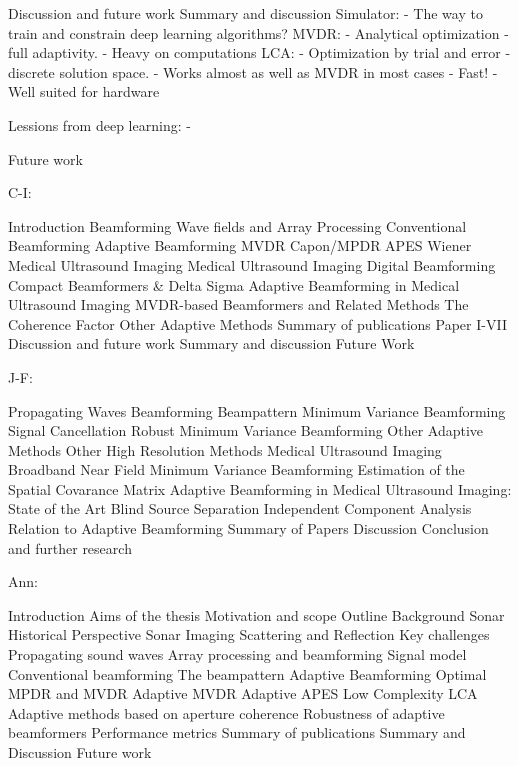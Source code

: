 Discussion and future work
   Summary and discussion
      Simulator:
      - The way to train and constrain deep learning algorithms?
      MVDR:
      - Analytical optimization - full adaptivity.
      - Heavy on computations
      LCA:
      - Optimization by trial and error - discrete solution space.
      - Works almost as well as MVDR in most cases
      - Fast!
      - Well suited for hardware
      
      Lessions from deep learning:
      - 
      
   Future work
   


C-I:

Introduction
   Beamforming
   Wave fields and Array Processing
   Conventional Beamforming
   Adaptive Beamforming
      MVDR
      Capon/MPDR
      APES
      Wiener
   Medical Ultrasound Imaging
   Medical Ultrasound Imaging
   Digital Beamforming
      Compact Beamformers \& Delta Sigma
      Adaptive Beamforming in Medical Ultrasound Imaging
         MVDR-based Beamformers and Related Methods
         The Coherence Factor
         Other Adaptive Methods
Summary of publications
   Paper I-VII
Discussion and future work
   Summary and discussion
   Future Work

   
J-F:

Propagating Waves
Beamforming
  Beampattern
Minimum Variance Beamforming
  Signal Cancellation
  Robust Minimum Variance Beamforming
  Other Adaptive Methods
  Other High Resolution Methods
Medical Ultrasound Imaging
  Broadband Near Field Minimum Variance Beamforming
  Estimation of the Spatial Covarance Matrix
Adaptive Beamforming in Medical Ultrasound Imaging: State of the Art
Blind Source Separation
  Independent Component Analysis
  Relation to Adaptive Beamforming
Summary  of Papers
Discussion
Conclusion and further research

Ann:

Introduction
   Aims of the thesis
   Motivation and scope
   Outline
Background
   Sonar
      Historical Perspective
      Sonar Imaging
      Scattering and Reflection
      Key challenges
   Propagating sound waves
   Array processing and beamforming
      Signal model
      Conventional beamforming
      The beampattern
   Adaptive Beamforming
      Optimal MPDR and MVDR
      Adaptive MVDR
      Adaptive APES
      Low Complexity LCA
      Adaptive methods based on aperture coherence
      Robustness of adaptive beamformers
   Performance metrics
Summary of publications
Summary and Discussion
Future work

